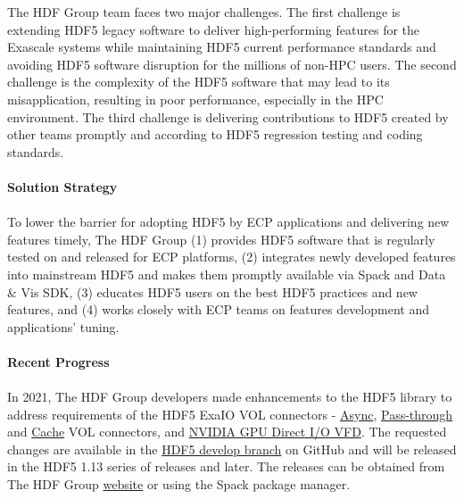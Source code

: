 The HDF Group team faces two major challenges. The first challenge is extending HDF5 legacy software to deliver high-performing features for the Exascale systems while maintaining HDF5 current performance standards and avoiding HDF5 software disruption for the millions of non-HPC users. The second challenge is the complexity of the HDF5 software that may lead to its misapplication, resulting in poor performance, especially in the HPC environment. The third challenge is delivering contributions to HDF5 created by other teams promptly and according to HDF5 regression testing and coding standards.

\paragraph{Solution Strategy}
\paragraph{}
To lower the barrier for adopting HDF5 by ECP applications and delivering new features timely, The HDF Group (1) provides HDF5 software that is regularly tested on and released for ECP platforms, (2) integrates newly developed features into mainstream HDF5 and makes them promptly available via Spack and Data \& Vis SDK, (3) educates HDF5 users on the best HDF5 practices and new features, and (4) works closely with ECP teams on features development and applications’ tuning. 

\paragraph{Recent Progress}
\paragraph{}
In 2021, The HDF Group developers made enhancements to the HDF5 library to address requirements of the HDF5 ExaIO VOL connectors - \href{https://github.com/hpc-io/vol-async}{Async}, \href{https://github.com/hpc-io/vol-external-passthrough}{Pass-through} and \href{https://github.com/hpc-io/vol-cache}{Cache} VOL connectors, and \href{https://github.com/hpc-io/vfd-gds}{NVIDIA GPU Direct I/O VFD}. The requested changes are available in the \href{https://github.com/HDFGroup/hdf5}{HDF5 develop branch} on GitHub and will be released in the HDF5 1.13 series of releases and later. The releases can be obtained from The HDF Group \href{https://portal.hdfgroup.org/display/support/Downloads}{website} or using the Spack package manager.  

